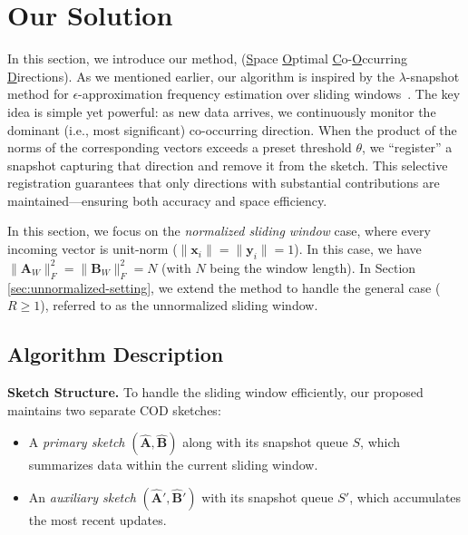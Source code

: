 

\section{Our Solution}
\label{sec:sec-prim}








In this section, we introduce our method, \oursolution (\underline{S}pace \underline{O}ptimal \underline{C}o-\underline{O}ccurring \underline{D}irections). As we mentioned earlier, our algorithm is inspired by the \(\lambda\)-snapshot method for \(\epsilon\)-approximation frequency estimation over sliding windows~\cite{LeeT06}.
The key idea is simple yet powerful: as new data arrives, we continuously monitor the dominant (i.e., most significant) co-occurring direction. When the product of the norms of the corresponding vectors exceeds a preset threshold \(\theta\), we “register” a snapshot capturing that direction and remove it from the sketch. This selective registration guarantees that only directions with substantial contributions are maintained—ensuring both accuracy and space efficiency.

 In this section, we focus on the \emph{normalized sliding window} case, where every incoming vector is unit-norm (\(\|\boldsymbol{x}_i\| = \|\boldsymbol{y}_i\| = 1\)). In this case, we have \(\|\boldsymbol{A}_W\|_F^2 = \|\boldsymbol{B}_W\|_F^2 = N\) (with \(N\) being the window length). In Section \ref{sec:unnormalized-setting}, we extend the method to handle the general case (\(R\geq 1\)), referred to as the unnormalized sliding window.





\subsection{Algorithm Description}

\textbf{Sketch Structure.}
To handle the sliding window efficiently, our proposed \oursolution maintains two separate COD sketches:
\begin{itemize}[topsep=0.5mm, partopsep=0pt, itemsep=0pt, leftmargin=10pt] 
  \item A {\em primary sketch} \((\hat{\boldsymbol{A}}, \hat{\boldsymbol{B}})\) along with its snapshot queue \(S\), which summarizes data within the current sliding window.
  \item An {\em auxiliary sketch} \((\hat{\boldsymbol{A}}', \hat{\boldsymbol{B}}')\) with its snapshot queue \(S'\), which accumulates the most recent updates.
\end{itemize}

